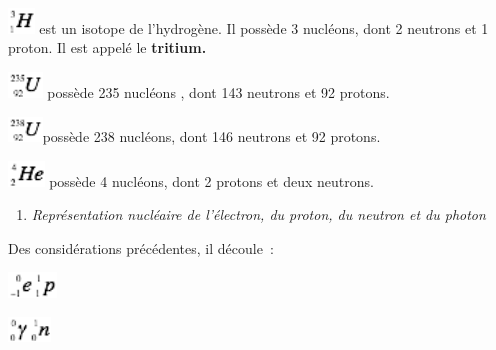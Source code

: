 \includegraphics[width=0.706cm,height=0.683cm]{Pictures/100000010000001400000013911DE4B8F4DAD2EC.png}
est un isotope de l'hydrogène. Il possède 3 nucléons, dont 2 neutrons et
1 proton. Il est appelé le \textbf{tritium.}

\includegraphics[width=0.918cm,height=0.683cm]{Pictures/100000010000001A000000131DF4E77671AB3F6E.png}
possède 235 nucléons , dont 143 neutrons et 92 protons.

\includegraphics[width=0.918cm,height=0.683cm]{Pictures/100000010000001A000000137145F016F0439DB0.png}possède
238 nucléons, dont 146 neutrons et 92 protons.

\includegraphics[width=0.966cm,height=0.683cm]{Pictures/100000010000001B00000013CE6DE589828DD379.png}
possède 4 nucléons, dont 2 protons et deux neutrons.

\begin{enumerate}
\def\labelenumi{\alph{enumi})}
\setcounter{enumi}{3}
\tightlist
\item
  \emph{Représentation nucléaire de l'électron, du proton, du neutron et
  du photon}
\end{enumerate}

Des considérations précédentes, il découle~:

\includegraphics[width=0.683cm,height=0.683cm]{Pictures/100000010000001300000013933991303C233C5E.png}\includegraphics[width=0.613cm,height=0.683cm]{Pictures/10000001000000110000001313D14D1355E58698.png}

\includegraphics[width=0.565cm,height=0.683cm]{Pictures/10000001000000100000001384CE4DB1D643C8F9.png}\includegraphics[width=0.565cm,height=0.683cm]{Pictures/10000001000000100000001354D441094A28B79D.png}

